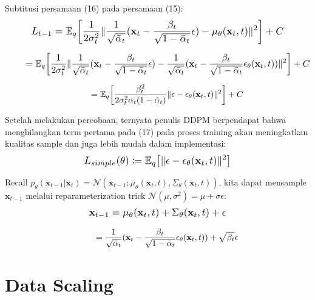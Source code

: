 \documentclass{article}
\newcommand*{\Scale}[2][4]{\scalebox{#1}{\ensuremath{#2}}}
\begin{document}
Subtitusi persamaan (16) pada persamaan (15):
\begin{equation}
\Scale[1.2]{ \displaystyle
L_{t-1} = \mathbb{E}_{q} \left[ 
\frac{1}{2\sigma_t^2}
\norm{
\frac{1}{\sqrt{\bar{\alpha}_t}} ( \textbf{x}_t - \frac{\beta_t}{\sqrt{1-\bar{\alpha}_t}} \epsilon)
-
\mu_\theta(\textbf{x}_t,t)
}^2
\right] + C }
\end{equation}

\begin{equation}
\Scale[1.2]{ \displaystyle
\hspace{2.25em} = \mathbb{E}_{q} \left[ 
\frac{1}{2\sigma_t^2}
\norm{
\frac{1}{\sqrt{\bar{\alpha}_t}} ( \textbf{x}_t - \frac{\beta_t}{\sqrt{1-\bar{\alpha}_t}} \epsilon)
-
\frac{1}{\sqrt{\bar{\alpha}_t}} ( \textbf{x}_t - \frac{\beta_t}{\sqrt{1-\bar{\alpha}_t}} \epsilon_\theta(\textbf{x}_t, t))
}^2
\right] + C }
\end{equation}

\begin{fleqn}[\parindent]
\begin{equation}
\begin{split}
\hspace{2.25em} = \mathbb{E}_{q} \left[ 
\frac{\beta_t^2}{2\sigma_t^2\alpha_t(1-\bar{\alpha}_t)}
\norm{
\epsilon
-
\epsilon_\theta(\textbf{x}_t, t)
}^2
\right] + C
\end{split}
\end{equation}
\end{fleqn}

Setelah melakukan percobaan, ternyata penulis DDPM berpendapat bahwa menghilangkan term pertama pada (17) pada proses training akan meningkatkan kualitas sample dan juga lebih mudah dalam implementasi:
\begin{equation}
\Scale[1.2]{ \displaystyle
L_{simple}(\theta) \coloneq \mathbb{E}_{q} \left[ 
\norm{
\epsilon
-
\epsilon_\theta(\textbf{x}_t, t)
}^2
\right] }
\end{equation}

Recall $ p_\theta(\textbf{x}_{t-1}|\textbf{x}_{t}) = \mathscr{N}(\textbf{x}_{t-1};\mu_\theta(\textbf{x}_{t},t),\Sigma_\theta(\textbf{x}_t, t)) $, kita dapat mensample $ \textbf{x}_{t-1} $ melalui reparameterization trick $ \mathscr{N}(\mu,\sigma^2) = \mu + \sigma \epsilon $:
\begin{equation}
\Scale[1.2]{ \displaystyle
\textbf{x}_{t-1} = \mu_\theta(\textbf{x}_{t},t) + \Sigma_\theta(\textbf{x}_{t},t) + \epsilon }
\end{equation}

\begin{fleqn}[\parindent]
\begin{equation}
\begin{split}
\hspace{2.25em} = \frac{1}{\sqrt{\bar{\alpha}_t}} ( \textbf{x}_t - \frac{\beta_t}{\sqrt{1-\bar{\alpha}_t}} \epsilon_\theta(\textbf{x}_t, t)) + \sqrt{\beta_t} \epsilon
\end{split}
\end{equation}
\end{fleqn}


\section{Data Scaling}
\end{document}
